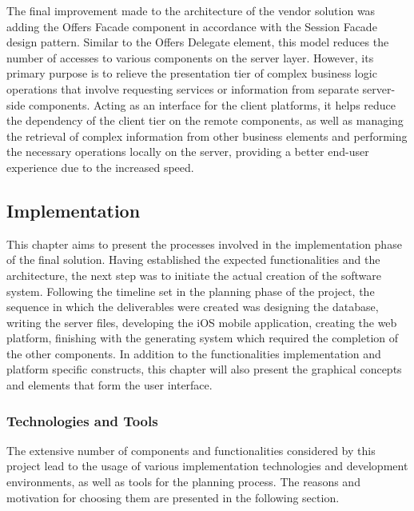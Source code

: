 The final improvement made to the architecture of the vendor solution was adding the Offers Facade component in accordance with the Session Facade design pattern. Similar to the Offers Delegate element, this model reduces the number of accesses to various components on the server layer. However, its primary purpose is to relieve the presentation tier of complex business logic operations that involve requesting services or information from separate server-side components. Acting as an interface for the client platforms, it helps reduce the dependency of the client tier on the remote components, as well as 
managing the retrieval of complex information from other business elements and performing the necessary operations locally on the server, providing a better end-user experience due to the increased speed.

\subsection{Implementation}

This chapter aims to present the processes involved in the implementation phase of the final solution. Having established the expected functionalities and the architecture, the next step was to initiate the actual creation of the software system. Following the timeline set in the planning phase of the project, the sequence in which the deliverables were created was designing the database, writing the server files, developing the iOS mobile application, creating the web platform, finishing with the generating system which required the completion of the other components. In addition to the functionalities implementation and platform specific constructs, this chapter will also present the graphical concepts and elements that form the user interface.

\subsubsection{Technologies and Tools}

The extensive number of components and functionalities considered by this project lead to the usage of various implementation technologies and development environments, as well as tools for the planning process. The reasons and motivation for choosing them are presented in the following section.\\

